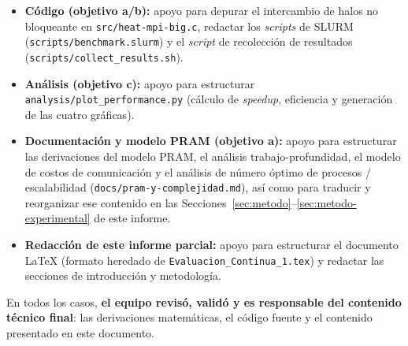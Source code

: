 \documentclass[11pt,a4paper]{article}
\begin{document}
	\begin{itemize}
		\item \textbf{Código (objetivo a/b):} apoyo para depurar el intercambio de
		halos no bloqueante en \texttt{src/heat-mpi-big.c}, redactar los
		\textit{scripts} de SLURM (\texttt{scripts/benchmark.slurm}) y el
		\textit{script} de recolección de resultados (\texttt{scripts/collect\_results.sh}).
		\item \textbf{Análisis (objetivo c):} apoyo para estructurar
		\texttt{analysis/plot\_performance.py} (cálculo de \textit{speedup},
		eficiencia y generación de las cuatro gráficas).
		\item \textbf{Documentación y modelo PRAM (objetivo a):} apoyo para
		estructurar las derivaciones del modelo PRAM, el análisis
		trabajo-profundidad, el modelo de costos de comunicación y el análisis de
		número óptimo de procesos / escalabilidad (\texttt{docs/pram-y-complejidad.md}),
		así como para traducir y reorganizar ese contenido en las
		Secciones~\ref{sec:metodo}--\ref{sec:metodo-experimental} de este informe.
		\item \textbf{Redacción de este informe parcial:} apoyo para estructurar el
		documento \LaTeX{} (formato heredado de \texttt{Evaluacion\_Continua\_1.tex}) y
		redactar las secciones de introducción y metodología.
	\end{itemize}

	En todos los casos, \textbf{el equipo revisó, validó y es responsable del
	contenido técnico final}: las derivaciones matemáticas, el código fuente y el
	contenido presentado en este documento.
\end{document}
